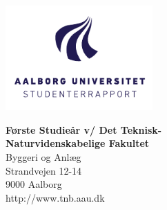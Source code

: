 

{}
\thispagestyle{empty}

\begin{minipage}[t]{0.48\textwidth}
\vspace*{-25pt}			%
\includegraphics[height=4cm]{billeder/AAU-logo-stud-DK-RGB}
\end{minipage}
\hfill
\begin{minipage}[t]{0.48\textwidth}
{\small 
\textbf{Første Studieår v/ Det Teknisk-}\\
\textbf{Naturvidenskabelige Fakultet}  \\
Byggeri og Anlæg \\
Strandvejen 12-14 \\
9000 Aalborg \\
http://www.tnb.aau.dk}
\end{minipage}

\vspace*{1cm}


